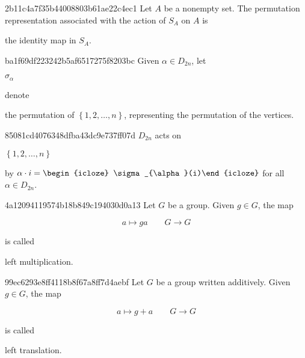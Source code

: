\begin{note}{2b11c4a7f35b44008803b61ae22c4ec1}
    Let \({ A }\) be a nonempty set.
    The permutation representation associated with the action of \({ S_{A} }\) on \({ A }\) is \begin{icloze}{1}the identity map in \({ S_{A} }\).\end{icloze}
\end{note}

\begin{note}{ba1f69df223242b5af6517275f8203bc}
    Given \({ \alpha \in D_{2n} }\), let \begin{icloze}{2}\({ \sigma_{\alpha} }\)\end{icloze} denote \begin{icloze}{1}the permutation of \({ \left\{ 1, 2, \ldots, n \right\} }\), representing the permutation of the vertices.\end{icloze}
\end{note}

\begin{note}{85081cd4076348dfba43dc9e737ff07d}
    \({ D_{2n} }\) acts on \begin{icloze}{2}\({ \left\{ 1, 2, \ldots, n \right\} }\)\end{icloze} by \({ \alpha \cdot i = \begin{icloze}{1}\sigma_{\alpha}(i)\end{icloze} }\) for all \({ \alpha \in D_{2n} }\).
\end{note}

\begin{note}{4a12094119574b18b849c194030d0a13}
    Let \({ G }\) be a group.
    Given \({ g \in G }\), the map
    \begin{icloze}{1}
        \[
            a \mapsto ga \qquad G \to G
        \]
    \end{icloze}
    is called \begin{icloze}{1}left multiplication.\end{icloze}
\end{note}

\begin{note}{99ec6293e8ff4118b8f67a8ff7d4aebf}
    Let \({ G }\) be a group written additively.
    Given \({ g \in G }\), the map
    \begin{icloze}{1}
        \[
            a \mapsto g + a \qquad G \to G
        \]
    \end{icloze}
    is called \begin{icloze}{1}left translation.\end{icloze}
\end{note}


